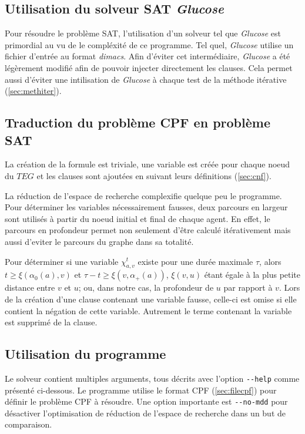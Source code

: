 \documentclass[french, 12pt, letterpaper]{article}
\theoremstyle{definition}
\theoremstyle{proposition}
\theoremstyle{example}
\begin{document}
    \subsection{Utilisation du solveur SAT \emph{Glucose}}
    \label{sec:satsolver}

    Pour résoudre le problème SAT, l'utilisation d'un solveur tel que \emph{Glucose} est primordial au vu de le compléxité de ce programme.
    Tel quel, \emph{Glucose} utilise un fichier d'entrée au format \emph{dimacs}.
    Afin d'éviter cet intermédiaire, \emph{Glucose} a été 
    légèrement modifié afin de pouvoir injecter directement les clauses.
    Cela permet aussi d'éviter une intilisation de \emph{Glucose} à chaque test de la méthode itérative (\ref{sec:methiter}).

    \subsection{Traduction du problème CPF en problème SAT}

    La création de la formule est triviale, une variable est créée pour chaque noeud du $TEG$ et les clauses sont ajoutées en
    suivant leurs définitions (\ref{sec:cnf}).

    La réduction de l'espace de recherche complexifie quelque peu le programme. 
    Pour déterminer les variables nécessairement fausses, deux parcours en largeur sont utilisés à partir
    du noeud initial et final de chaque agent.
    En effet, le parcours en profondeur permet non seulement d'être calculé itérativement mais aussi d'eviter le parcours du graphe dans sa totalité.

    Pour déterminer si une variable $\chi^t_{a, v}$ existe pour une durée maximale $\tau$, alors $t \ge \xi(\alpha_0(a), v)$ et
    $\tau - t \ge \xi(v, \alpha_+(a))$, $\xi(v, u)$ étant égale à la plus petite distance entre $v$ et $u$; ou, dans notre cas,
    la profondeur de $u$  par rapport à $v$. 
    Lors de la création d'une clause contenant une variable fausse, celle-ci est omise si elle contient la négation de cette variable.
    Autrement le terme contenant la variable est supprimé de la clause.


    \subsection{Utilisation du programme}

    Le solveur contient multiples arguments, tous décrits avec l'option \lstinline{--help} comme présenté ci-dessous.
    Le programme utilise le format CPF (\ref{sec:filecpf}) pour définir le problème CPF à résoudre. 
    Une option importante est \lstinline{--no-mdd} pour désactiver l'optimisation de réduction de l'espace de recherche dans un but de 
    comparaison. 
    
\end{document}
